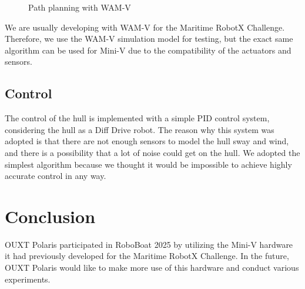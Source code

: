 \documentclass[lettersize,journal]{IEEEtran}
\begin{document}
\begin{figure}[H]
  \begin{center}
  \end{center}
  \caption{Path planning with WAM-V}
  \label{fig:planning}
\end{figure}

We are usually developing with WAM-V for the Maritime RobotX Challenge. Therefore, we use the WAM-V simulation model for testing, but the exact same algorithm can be used for Mini-V due to the compatibility of the actuators and sensors.

\subsection{Control}

The control of the hull is implemented with a simple PID control system, considering the hull as a Diff Drive robot.
The reason why this system was adopted is that there are not enough sensors to model the hull sway and wind, and there is a possibility that a lot of noise could get on the hull.
We adopted the simplest algorithm because we thought it would be impossible to achieve highly accurate control in any way.

\section{Conclusion}

OUXT Polaris participated in RoboBoat 2025 by utilizing the Mini-V hardware it had previously developed for the Maritime RobotX Challenge.
In the future, OUXT Polaris would like to make more use of this hardware and conduct various experiments.
\end{document}
